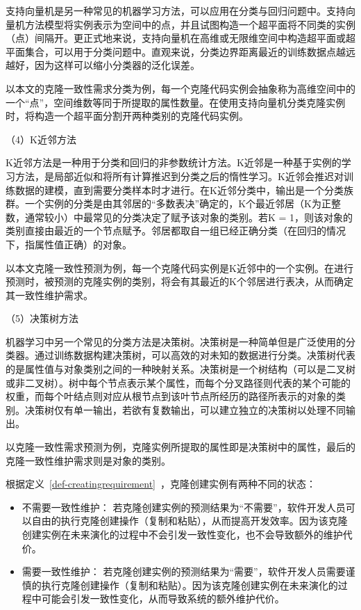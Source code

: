 支持向量机是另一种常见的机器学习方法，可以应用在分类与回归问题中。支持向量机方法模型将实例表示为空间中的点，并且试图构造一个超平面将不同类的实例（点）间隔开。更正式地来说，支持向量机在高维或无限维空间中构造超平面或超平面集合，可以用于分类问题中。直观来说，分类边界距离最近的训练数据点越远越好，因为这样可以缩小分类器的泛化误差。

以本文的克隆一致性需求分类为例，每一个克隆代码实例会抽象称为高维空间中的一个“点”，空间维数等同于所提取的属性数量。在使用支持向量机分类克隆实例时，将构造一个超平面分割开两种类别的克隆代码实例。

（4）K近邻方法

K近邻方法是一种用于分类和回归的非参数统计方法。K近邻是一种基于实例的学习方法，是局部近似和将所有计算推迟到分类之后的惰性学习。K近邻会推迟对训练数据的建模，直到需要分类样本时才进行。在K近邻分类中，输出是一个分类族群。一个实例的分类是由其邻居的“多数表决”确定的，K个最近邻居（K为正整数，通常较小）中最常见的分类决定了赋予该对象的类别。若K = 1，则该对象的类别直接由最近的一个节点赋予。邻居都取自一组已经正确分类（在回归的情况下，指属性值正确）的对象。

以本文克隆一致性预测为例，每一个克隆代码实例是K近邻中的一个实例。在进行预测时，被预测的克隆实例的类别，将会有其最近的K个邻居进行表决，从而确定其一致性维护需求。

（5）决策树方法

机器学习中另一个常见的分类方法是决策树。决策树是一种简单但是广泛使用的分类器。通过训练数据构建决策树，可以高效的对未知的数据进行分类。决策树代表的是属性值与对象类别之间的一种映射关系。决策树是一个树结构（可以是二叉树或非二叉树）。树中每个节点表示某个属性，而每个分叉路径则代表的某个可能的权重，而每个叶结点则对应从根节点到该叶节点所经历的路径所表示的对象的类别。决策树仅有单一输出，若欲有复数输出，可以建立独立的决策树以处理不同输出。

以克隆一致性需求预测为例，克隆实例所提取的属性即是决策树中的属性，最后的克隆一致性维护需求则是对象的类别。

根据定义~\ref{def-creatingrequirement}~，克隆创建实例有两种不同的状态：
\begin{itemize}
\item 
不需要一致性维护：
若克隆创建实例的预测结果为“不需要”，软件开发人员可以自由的执行克隆创建操作（复制和粘贴），从而提高开发效率。因为该克隆创建实例在未来演化的过程中不会引发一致性变化，也不会导致额外的维护代价。
\item
需要一致性维护：
若克隆创建实例的预测结果为“需要”，软件开发人员需要谨慎的执行克隆创建操作（复制和粘贴）。因为该克隆创建实例在未来演化的过程中可能会引发一致性变化，从而导致系统的额外维护代价。
\end{itemize}

